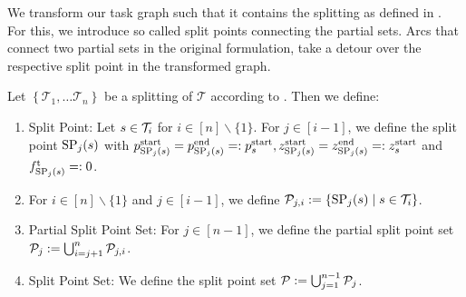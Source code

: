 We transform our task graph such that it contains the splitting as defined in . For this, we introduce so called split points connecting the partial sets. Arcs that connect two partial sets in the original formulation, take a detour over the respective split point in the transformed graph.

\begin{definition}

Let $\left\{\mathcal{T}_1,\dots\mathcal{T}_n\right\}$ be a splitting of $\mathcal{T}$ according to . Then we define:
\begin{enumerate}
	\item{Split Point: Let $s\in\mathcal{T}_i$ for $i\in[n]\backslash\{1\}$. For $j\in[i-1]$, we define the split point $\operatorname{SP}_j(s)$ with $p^{\operatorname{start}}_{\operatorname{SP}_j(s)}=p^{\operatorname{end}}_{\operatorname{SP}_j(s)}=:p^{\operatorname{start}}_s, z^{\operatorname{start}}_{\operatorname{SP}_j(s)}=z^{\operatorname{end}}_{\operatorname{SP}_j(s)}=:z^{\operatorname{start}}_s$ and $f^{\operatorname{t}}_{\operatorname{SP}_j(s)}=:0$.}
	\item{For $i\in[n]\backslash\{1\}$ and $j\in[i-1]$, we define $\mathcal{P}_{j,i}:=\left\{\operatorname{SP}_j(s)\mid s\in\mathcal{T}_i\right\}$.}
	\item{Partial Split Point Set: For $j\in[n-1]$, we define the partial split point set $\mathcal{P}_j:=\bigcup_{i=j+1}^n \mathcal{P}_{j,i}$.}
	\item{Split Point Set: We define the split point set $\mathcal{P}:=\bigcup_{j=1}^{n-1}\mathcal{P}_j$.}
\end{enumerate}


\end{definition}

